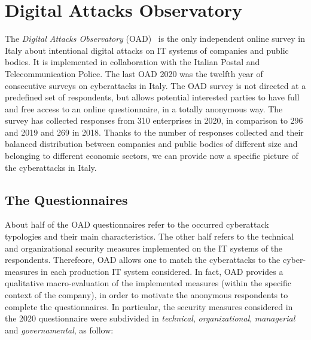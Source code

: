 \documentclass{easychair}
\begin{document}
\section{Digital Attacks Observatory}\label{sec:DigitalAttacksObservatory}

The \textit{Digital Attacks Observatory} (OAD)~\cite{oadweb} is the only independent online survey in Italy about intentional digital attacks on IT systems of companies and public
bodies. It is implemented in collaboration with the Italian Postal and Telecommunication Police.
The last OAD 2020 was the twelfth year of consecutive surveys on cyberattacks in Italy.
The OAD survey is not directed at a predefined set of respondents, but allows potential interested
parties to have full and free access to an online questionnaire, in a totally anonymous way.
The survey has collected responses from 310 enterprises in 2020, in comparison
to 296 and 2019 and 269 in 2018.
Thanks to the number of responses collected and their balanced distribution between companies and public bodies of different size and belonging to different economic
sectors, we can provide now a specific picture of the cyberattacks in Italy.

\subsection{The Questionnaires}

About half of the OAD questionnaires refer to the occurred
cyberattack typologies and their main characteristics.
The other half refers to the technical and organizational security measures implemented
on the IT systems of the respondents. 
Therefeore, OAD allows one to match the cyberattacks to the cyber-measures in each production
IT system considered. 
In fact, OAD provides a qualitative macro-evaluation of the implemented measures
(within the specific context of the company), in order to motivate the anonymous respondents
to complete the questionnaires.
In particular, the security measures considered in the 2020 questionnaire were subdivided
in \emph{technical}, \emph{organizational}, \emph{managerial} and \emph{governamental}, as follow:
\end{document}
